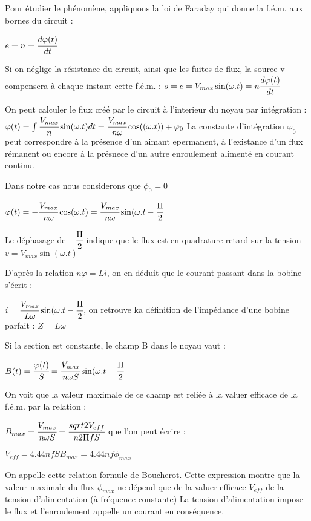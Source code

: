 
Pour étudier le phénomène, appliquons la loi de Faraday qui donne la f.é.m. aux bornes du circuit : 

$e = n= \cfrac{d\varphi(t)}{dt}$

Si on néglige la résistance du circuit, ainsi que les fuites de flux, la source v compensera à chaque instant cette f.é.m. : 
$s = e = V_{max}\sin(\omega.t) = n\cfrac{d\varphi(t)}{dt}$

On peut calculer le flux créé par le circuit à l'interieur du noyau par intégration :
$\varphi(t) = \int {\cfrac{V_{max}}{n} \sin(\omega.t) dt} = \cfrac{V_{max}}{n\omega}\cos((\omega.t)) + \varphi_0$
La constante d'intégration $\varphi_0$ peut correspondre à la présence d'un aimant epermanent, à l'existance d'un flux rémanent ou encore à la présnece d'un autre enroulement alimenté en courant continu. 

Dans notre cas nous considerons que $\phi_0 = 0$

$\varphi(t) = - \cfrac{V_{max}}{n\omega} \cos(\omega.t) = \cfrac{V_{max}}{n\omega} \sin(\omega.t - \cfrac{\Pi}{2}$

Le déphasage de $- \cfrac{\Pi}{2}$ indique que le flux est en quadrature retard sur la tension $v =  V_{max}\sin(\omega.t)$

D'après la relation $n\varphi = Li$, on en déduit que le courant passant dans la bobine s'écrit : 

$i = \cfrac{V_{max}}{L\omega} \sin(\omega.t - \cfrac{\Pi}{2}$, on retrouve ka définition de l'impédance d'une bobine parfait : $Z = L\omega$

Si la section est constante, le champ B dans le noyau vaut : 

$B(t) =  \cfrac{\varphi(t)}{S} = \cfrac{V_{max}}{n\omega S}\sin(\omega.t - \cfrac{\Pi}{2}$

On voit que la valeur maximale de ce champ est reliée à la valuer efficace de la f.é.m. par la relation :

$B_{max} =  \cfrac{V_{max}}{n\omega S} = \cfrac{sqrt{2}V_{eff}}{n 2\Pi f S}$ que l'on peut écrire : 

$V_{eff} = 4.44 n f S B_{max} = 4.44 n f \phi_{max}$

On appelle cette relation formule de Boucherot. Cette expression montre que la valeur maximale du flux $\phi_{max}$ ne dépend que de la valuer efficace $V_{eff} $ de la tension d'alimentation (à fréquence constante) La tension d'alimentation impose le flux et l'enroulement appelle un courant en conséquence. 